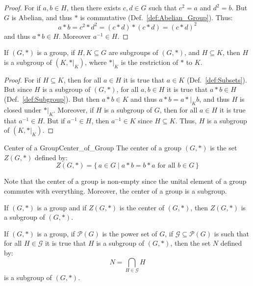         \begin{proof}
            For if $a,b\in{H}$, then there exists $c,d\in{G}$ such that
            $c^{2}=a$ and $d^{2}=b$. But $G$ is Abelian, and thus $*$ is
            commutative (Def.~\ref{def:Abelian_Group}). Thus:
            \begin{equation}
                a*b=c^{2}*d^{2}=(c*d)*(c*d)=(c*d)^{2}
            \end{equation}
            and thus $a*b\in{H}$. Moreover $a^{\minus{1}}\in{H}$.
        \end{proof}
        \begin{theorem}
            If $(G,*)$ is a group, if $H,K\subseteq{G}$ are subgroups of
            $(G,*)$, and $H\subseteq{K}$, then $H$ is a subgroup of
            $(K,*|_{K})$, where $*|_{K}$ is the restriction of $*$ to $K$.
        \end{theorem}
        \begin{proof}
            For if $H\subseteq{K}$, then for all $a\in{H}$ it is true that
            $a\in{K}$ (Def.~\ref{def:Subsets}). But since $H$ is a subgroup of
            $(G,*)$, for all $a,b\in{H}$ it is true that $a*b\in{H}$
            (Def.~\ref{def:Subgroup}). But then $a*b\in{K}$ and thus
            $a*b=a*|_{K}b$, and thus $H$ is closed under $*|_{K}$. Moreover, if
            $H$ is a subgroup of $G$, then for all $a\in{H}$ it is true that
            $a^{\minus{1}}\in{H}$. But if $a^{\minus{1}}\in{H}$, then
            $a^{\minus{1}}\in{K}$ since $H\subseteq{K}$. Thus, $H$ is a subgroup
            of $(K,*|_{K})$.
        \end{proof}
        \begin{fdefinition}{Center of a Group}{Center_of_Group}
            The center of a group $(G,*)$ is the set $Z(G,*)$ defined by:
            \begin{equation*}
                Z(G,*)=\{\,a\in{G}\;|\;a*b=b*a\textrm{ for all }b\in{G}\,\}
            \end{equation*}
        \end{fdefinition}
        Note that the center of a group is non-empty since the unital element
        of a group commutes with everything. Moreover, the center of a group is
        a subgroup.
        \begin{theorem}
            If $(G,*)$ is a group and if $Z(G,*)$ is the center of $(G,*)$, then
            $Z(G,*)$ is a subgroup of $(G,*)$.
        \end{theorem}
        \begin{theorem}
            If $(G,*)$ is a group, if $\mathcal{P}(G)$ is the power set of $G$,
            if $\mathcal{G}\subseteq\mathcal{P}(G)$ is such that for all
            $H\in\mathcal{G}$ it is true that $H$ is a subgroup of $(G,*)$, then
            the set $N$ defined by:
            \begin{equation}
                N=\bigcap_{H\in\mathcal{G}}H
            \end{equation}
            is a subgroup of $(G,*)$.
        \end{theorem}
